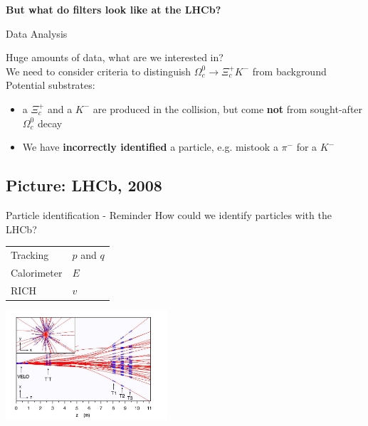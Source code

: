 \begin{frame}

\LARGE \textbf{But what do filters look like at the LHCb?}
    
\end{frame}
\begin{frame}{Data Analysis}

Huge amounts of data, what are we interested in?\\ %
\vspace{0.2cm}
 We need to consider criteria to distinguish $\Omega_c^0 \rightarrow \Xi_c^+ K^-$ from background\\%
\vspace{0.5cm}
Potential substrates: 
\begin{itemize}
    \item a $\Xi_c^+$ and a $K^-$ are produced in the collision, but come \textbf{not} from sought-after $\Omega_c^0$ decay%
    \item We have \textbf{incorrectly identified} a particle, e.g. mistook a $\pi^-$ for a $K^-$
\end{itemize}
\end{frame}
\subsection{Picture: LHCb, 2008}
\begin{frame}{Particle identification - Reminder}
How could we identify particles with the LHCb? \\
\vspace{0.5cm}
\begin{center}
    \begin{tabular}{ll}
    Tracking &  $p$ and $q$\\
    Calorimeter & $E$ \\
    RICH & $v$ \\
\end{tabular}
\end{center}

\vspace{0.5cm}
\begin{center}
    \includegraphics[width = 0.45\textwidth]{Figures Lecture on Datanalysis/2D-Eventdisplay.png}
\end{center}  
\end{frame}
